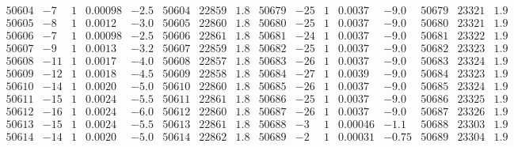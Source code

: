 \documentclass[11pt,reqno,a4letter]{article}
\numberwithin{figure}{section}
\numberwithin{table}{section}
\theoremstyle{plain}
\numberwithin{theorem}{section}
\theoremstyle{definition}
\begin{document}
\begin{table}[ht]
\begin{equation*}
{\begin{array}{ccccc|ccc||ccccc|ccc}
50604 & -7 & 1 & 0.00098 & -2.5 & 50604 & 22859 & 1.8 & 50679 & -25 & 1 & 0.0037 & -9.0 & 50679 & 23321 & 1.9  \\
50605 & -8 & 1 & 0.0012 & -3.0 & 50605 & 22860 & 1.8 & 50680 & -25 & 1 & 0.0037 & -9.0 & 50680 & 23321 & 1.9  \\
50606 & -7 & 1 & 0.00098 & -2.5 & 50606 & 22861 & 1.8 & 50681 & -24 & 1 & 0.0037 & -9.0 & 50681 & 23322 & 1.9  \\
50607 & -9 & 1 & 0.0013 & -3.2 & 50607 & 22859 & 1.8 & 50682 & -25 & 1 & 0.0037 & -9.0 & 50682 & 23323 & 1.9  \\
50608 & -11 & 1 & 0.0017 & -4.0 & 50608 & 22857 & 1.8 & 50683 & -26 & 1 & 0.0037 & -9.0 & 50683 & 23324 & 1.9  \\
50609 & -12 & 1 & 0.0018 & -4.5 & 50609 & 22858 & 1.8 & 50684 & -27 & 1 & 0.0039 & -9.0 & 50684 & 23323 & 1.9  \\
50610 & -14 & 1 & 0.0020 & -5.0 & 50610 & 22860 & 1.8 & 50685 & -26 & 1 & 0.0037 & -9.0 & 50685 & 23324 & 1.9  \\
50611 & -15 & 1 & 0.0024 & -5.5 & 50611 & 22861 & 1.8 & 50686 & -25 & 1 & 0.0037 & -9.0 & 50686 & 23325 & 1.9  \\
50612 & -16 & 1 & 0.0024 & -6.0 & 50612 & 22860 & 1.8 & 50687 & -26 & 1 & 0.0037 & -9.0 & 50687 & 23326 & 1.9  \\
50613 & -15 & 1 & 0.0024 & -5.5 & 50613 & 22861 & 1.8 & 50688 & -3 & 1 & 0.00046 & -1.1 & 50688 & 23303 & 1.9  \\
50614 & -14 & 1 & 0.0020 & -5.0 & 50614 & 22862 & 1.8 & 50689 & -2 & 1 & 0.00031 & -0.75 & 50689 & 23304 & 1.9  \\
\end{array} 
}
\end{equation*} 
\clearpage 

\end{table} 

\clearpage 
\end{document}
